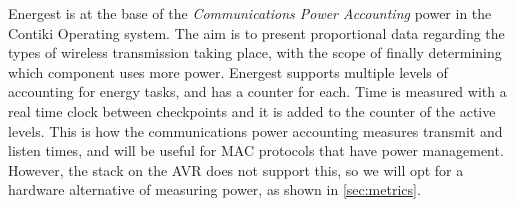 Energest is at the base of the \textit{Communications Power Accounting} power in the Contiki Operating system. The aim is to 
present proportional data regarding the types of wireless transmission taking place, with the scope of finally determining
which component uses more power. Energest supports multiple levels of accounting for energy tasks, and has a counter for each.
Time is measured with a real time clock between checkpoints and it is added to the counter of the active levels. This is how
the communications power accounting measures transmit and listen times, and will be useful for MAC protocols that have power
management. However, the stack on the AVR does not support this, so we will opt for a hardware alternative of measuring power,
as shown in \ref{sec:metrics}.

